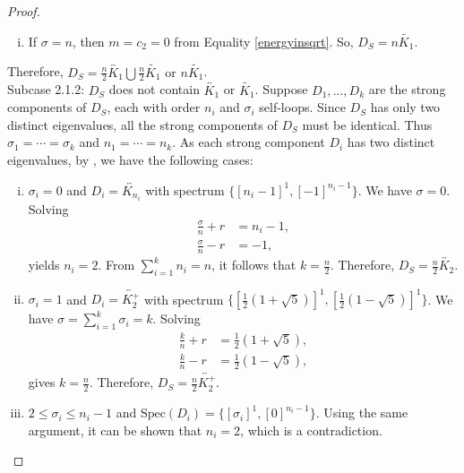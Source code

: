 \documentclass[12pt,a4paper,reqno]{amsart}
\numberwithin{equation}{section}
\theoremstyle{plain}
\theoremstyle{definition}
\newcommand{\<}{\langle}
\renewcommand{\>}{\rangle}
\begin{document}
\begin{proof}
\begin{enumerate}
\begin{enumerate}
\begin{enumerate}[i.]
				\item If $\sigma =n$, then $m=c_2=0$ from Equality \eqref{energyinsqrt}. So, $D_S=n\widetilde{K_1}$.
			\end{enumerate}
			Therefore, $D_S=\frac{n}{2} \overleftrightarrow{K_1} \bigcup \frac{n}{2} \widetilde{K_1} \text{ or }n\widetilde{K_1}$.\\
			
			Subcase 2.1.2: $D_S$ does not contain $\overleftrightarrow{K_1}$ or $\widetilde{K_1}$. Suppose $D_1,\ldots, D_k$ are the strong components of $D_S$, each with order $n_i$ and $\sigma_i$ self-loops. Since $D_S$ has only two distinct eigenvalues, all the strong components of $D_S$ must be identical. Thus $\sigma_1=\cdots=\sigma_k$ and $n_1=\cdots=n_k$. As each strong component $D_i$ has two distinct eigenvalues, by \cite[Corollary 3.5]{cavers2025distinct}, we have the following cases:
            \begin{enumerate}[(i)]
                \item $\sigma_i=0$ and $D_i=\overleftrightarrow{K_{n_i}}$ with spectrum $\{[n_i-1]^1,[-1]^{n_i-1} \}$. We have $\sigma=0$.
                Solving 
                \begin{align*}
                    \frac{\sigma}{n}+r &= n_i-1, \\
                    \frac{\sigma}{n}-r &= -1,
                \end{align*}
            yields $n_i=2$. From $\sum_{i=1}^k n_i=n$, it follows that $k=\frac{n}{2}$. Therefore, $D_S=\frac{n}{2} \overleftrightarrow{K_2}$.

                \item $\sigma_i=1$ and $D_i=\overleftrightarrow{K_2^+}$ with spectrum $\{ [\frac{1}{2}(1+\sqrt{5})]^1, [\frac{1}{2}(1-\sqrt{5})]^1 \}$. We have $\sigma=\sum_{i=1}^k \sigma_i = k$. 
                Solving 
                \begin{align*}
                    \frac{k}{n}+r &=\frac{1}{2}(1+\sqrt{5}), \\
                    \frac{k}{n}-r &=\frac{1}{2}(1-\sqrt{5}),
                \end{align*}
                gives $k=\frac{n}{2}$. Therefore, $D_S=\frac{n}{2}\overleftrightarrow{K_2^+}$.

                \item $2\leq\sigma_i\leq n_i-1$ and $\text{Spec}(D_i)=\{[\sigma_i]^1, [0]^{n_i-1}\}$. Using the same argument, it can be shown that $n_i=2$, which is a contradiction. 


\end{enumerate}
\end{enumerate}
\end{enumerate}
\end{proof}
\end{document}
